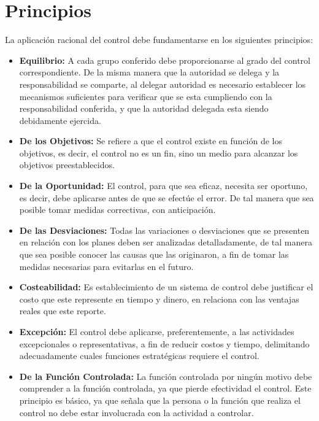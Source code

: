 \documentclass[12pt,letterpaper]{article}
\begin{document}
\section{Principios}
La aplicación racional del control debe fundamentarse en los siguientes principios:
\begin{itemize}
\item \textbf{Equilibrio:} A cada grupo conferido debe proporcionarse al grado del control correspondiente. De la misma manera que la autoridad se delega y la responsabilidad se comparte, al delegar autoridad es necesario establecer los mecanismos suficientes para verificar que se esta cumpliendo con la responsabilidad conferida, y que la autoridad delegada esta siendo debidamente ejercida.
\item \textbf{De los Objetivos:} Se refiere a que el control existe en función de los objetivos, es decir, el control no es un fin, sino un medio para alcanzar los objetivos preestablecidos.
\item \textbf{De la Oportunidad:} El control, para que sea eficaz, necesita ser oportuno, es decir, debe aplicarse antes de que se efectúe el error. De tal manera que sea posible tomar medidas correctivas, con anticipación.
\item \textbf{De las Desviaciones:} Todas las variaciones o desviaciones que se presenten en relación con los planes deben ser analizadas detalladamente, de tal manera que sea posible conocer las causas que las originaron, a fin de tomar las medidas necesarias para evitarlas en el futuro.
\item \textbf{Costeabilidad: }Es establecimiento de un sistema de control debe justificar el costo que este represente en tiempo y dinero, en relaciona con las ventajas reales que este reporte.
\item \textbf{Excepción:} El control debe aplicarse, preferentemente, a las actividades excepcionales o representativas, a fin de reducir costos y tiempo, delimitando adecuadamente cuales funciones estratégicas requiere el control.
\item \textbf{De la Función Controlada:} La función controlada por ningún motivo debe comprender a la función controlada, ya que pierde efectividad el control. Este principio es básico, ya que señala que la persona o la función que realiza el control no debe estar involucrada con la actividad a controlar.

\end{itemize}
\end{document}
